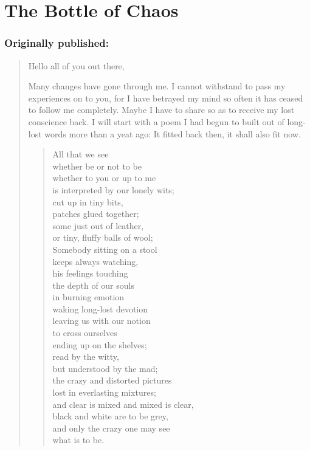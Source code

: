 \chapter{The Bottle of Chaos}
\label{cha:bottle-of-chaos}
\subsection*{Originally published: }
\begin{quote}
Hello all of you out there, 

Many changes have gone through me. I cannot withstand to pass my experiences on to you, for I have betrayed my mind so often it has ceased to follow me completely. Maybe I have to share so as to receive my lost conscience back. 
I will start with a poem I had begun to built out of long-lost words more than a yeat ago: It fitted back then, it shall also fit now. 

\begin{verse}
All that we see \\
whether be or not to be \\
whether to you or up to me \\
is interpreted by our lonely wits; \\
cut up in tiny bits, \\
patches glued together; \\
some just out of leather, \\
or tiny, fluffy balls of wool; \\
Somebody sitting on a stool \\
keeps always watching, \\
his feelings touching\\
the depth of our souls \\
in burning emotion \\
waking long-lost devotion \\
leaving us with our notion \\
to cross ourselves \\
ending up on the shelves; \\
read by the witty, \\
but understood by the mad; \\
the crazy and distorted pictures \\
lost in everlasting mixtures; \\
and clear is mixed and mixed is clear, \\
black and white are to be grey, \\
and only the crazy one may see \\
what is to be.
\end{verse}


\end{quote}

